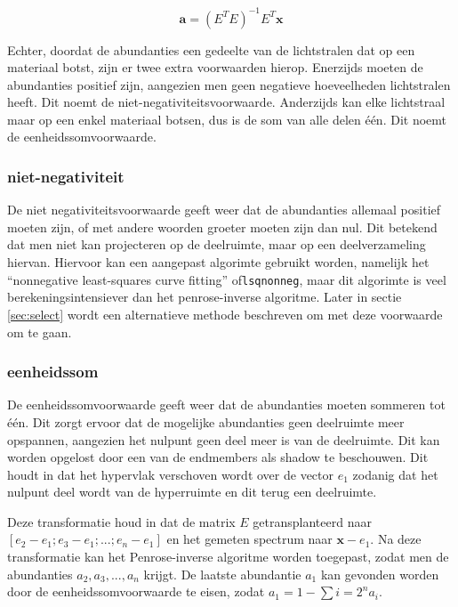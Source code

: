 \documentclass[12pt]{report}
\begin{document}
\begin{equation}
\bm{a} = (E^T E)^{-1} E^T \bm{x}
\end{equation}

Echter, doordat de abundanties een gedeelte van de lichtstralen dat op een materiaal botst, zijn er twee extra voorwaarden hierop. Enerzijds moeten de abundanties positief zijn, aangezien men geen negatieve hoeveelheden lichtstralen heeft. Dit noemt de niet-negativiteitsvoorwaarde. Anderzijds kan elke lichtstraal maar op een enkel materiaal botsen, dus is de som van alle delen \'e\'en. Dit noemt de eenheidssomvoorwaarde.  


\subsubsection{niet-negativiteit}

De niet negativiteitsvoorwaarde geeft weer dat de abundanties allemaal positief moeten zijn, of met andere woorden groeter moeten zijn dan nul. Dit betekend dat men niet kan projecteren op de deelruimte, maar op een deelverzameling hiervan. Hiervoor kan een aangepast algorimte gebruikt worden, namelijk het ``nonnegative least-squares curve fitting'' of\texttt{lsqnonneg}, maar dit algorimte is veel berekeningsintensiever dan het penrose-inverse algoritme. Later in sectie \ref{sec:select} wordt een alternatieve methode beschreven om met deze voorwaarde om te gaan.

\subsubsection{eenheidssom}

De eenheidssomvoorwaarde geeft weer dat de abundanties moeten sommeren tot \'e\'en. Dit zorgt ervoor dat de mogelijke abundanties geen deelruimte meer opspannen, aangezien het nulpunt geen deel meer is van de deelruimte. Dit kan worden opgelost door een van de endmembers als shadow te beschouwen. Dit houdt in dat het hypervlak verschoven wordt over de vector $e_1$ zodanig dat het nulpunt deel wordt van de hyperruimte en dit terug een deelruimte.

Deze transformatie houd in dat de matrix $E$ getransplanteerd naar $[e_2-e_1;e_3-e_1;...;e_n-e_1]$ en het gemeten spectrum naar $\bm{x} - e_1$. Na deze transformatie kan het Penrose-inverse algoritme worden toegepast, zodat men de abundanties $a_2,a_3,...,a_n$ krijgt. De laatste abundantie $a_1$ kan gevonden worden door de eenheidssomvoorwaarde te eisen, zodat $a_1 = 1 - \sum{i=2}^{n} a_i$.
\end{document}
